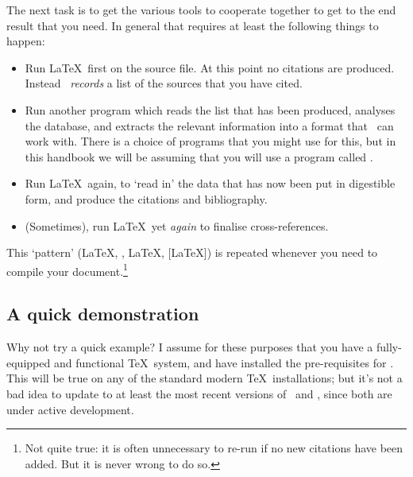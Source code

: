 The next task is to get the various tools to cooperate together to get
to the end result that you need.
In general that requires at least the
following things to happen:
\begin{itemize}
\item Run \LaTeX\ first on the source file. At this point no citations
  are produced. Instead \biblatex\ \emph{records} a list of the
  sources that you have cited.
\item Run another program which reads the list that has been produced,
  analyses the database, and extracts the relevant information into a
  format that \biblatex\ can work with. There is a choice of programs
  that you might use for this, but in this handbook we will be
  assuming that you will use a program called .
\item Run \LaTeX\ again, to `read in' the data that has now been put
  in digestible form, and produce the citations and bibliography.
\item (Sometimes), run \LaTeX\ yet \emph{again} to finalise
  cross-references.
\end{itemize}

This `pattern' (\LaTeX, , \LaTeX, [\LaTeX]) is repeated
whenever you need to compile your document.\footnote{Not quite true:
  it is often unnecessary to re-run  if no new
  citations have been added. But it is never wrong to do so.}

\subsection{A quick demonstration\label{neophyte:example}}
Why not try a quick example? I assume for these purposes that you have
a fully-equipped and functional \TeX\ system, and have installed the
pre-requisites for \biblatex. This will be true on any of the standard
modern \TeX\ installations; but it's not a bad idea to update to at
least the most recent versions of \biblatex\ and ,
since both are under active development.


